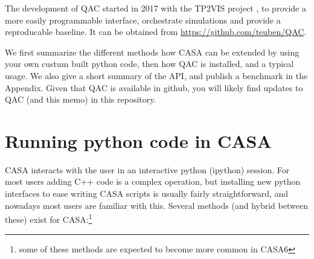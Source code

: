 \documentclass[11pt,twoside]{article}
\begin{document}

The development of QAC started in 2017 with the TP2VIS project \citep{tp2vis}, to provide a
more easily programmable interface, orchestrate simulations and provide a
reproducable baseline. It can be obtained from \url{https://github.com/teuben/QAC}.

We first summarize the different methods how CASA can be extended by using your own
custum built python code, then how QAC is installed, and a typical usage. We also give a short
summary of the API, and publish a benchmark in the Appendix. Given that QAC is available
in github, you will likely find updates to QAC (and this memo) in this repository.

\section{Running python code in CASA}

CASA interacts with the user in an interactive python (ipython) session. For most users adding 
C++ code is a complex operation, but installing new python interfaces to ease writing CASA scripts
is usually fairly straightforward, and nowadays most users are familiar with this.
Several methods (and hybrid between these) exist
for CASA:\footnote{some of these methods are expected to become more common in CASA6}
\end{document}
